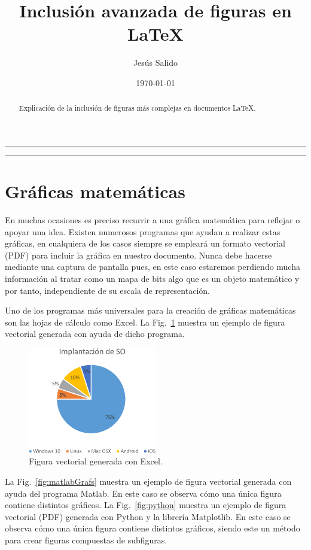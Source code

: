 \documentclass[11pt,a4paper]{article}
\author{Jesús Salido}
\title{Inclusión avanzada de figuras en \LaTeX{}}
\date{\today}
\begin{document}
\maketitle

\begin{abstract}
	Explicación de la inclusión de figuras más complejas en documentos \LaTeX{}.
\end{abstract}

\hrule
\tableofcontents
\listoffigures
\bigskip
\hrule

\section{Gráficas matemáticas}
En muchas ocasiones es preciso recurrir a una gráfica matemática para reflejar o apoyar una idea. Existen numerosos programas que ayudan a realizar estas gráficas, en cualquiera de los casos siempre se empleará un formato vectorial (\textsf{PDF}) para incluir la gráfica en nuestro documento. Nunca debe hacerse mediante una captura de pantalla pues, en este caso estaremos perdiendo mucha información al tratar como un mapa de bits algo que es un objeto matemático y por tanto, independiente de su escala de representación.

Uno de los programas más universales para la creación de gráficas matemáticas son las hojas de cálculo como Excel. La Fig.~\ref{fig:excel} muestra un ejemplo de figura vectorial generada con ayuda de dicho programa.

\begin{figure}[hbt]
	\centering
	\includegraphics[width=0.5\textwidth]{EjFigsExcelOrig-crop} 
	\caption[Gráfico de Excel]{Figura vectorial generada con Excel.}
	\label{fig:excel}
\end{figure}

La Fig.~\ref{fig:matlabGrafs} muestra un ejemplo de figura vectorial generada con ayuda del programa Matlab. En este caso se observa cómo una única figura contiene distintos gráficos. La Fig.~\ref{fig:python} muestra un ejemplo de figura vectorial (\textsf{PDF}) generada con Python y la librería \textsf{Matplotlib}. En este caso se observa cómo una única figura contiene distintos gráficos, siendo este un método para crear figuras compuestas de subfiguras.
\end{document}
